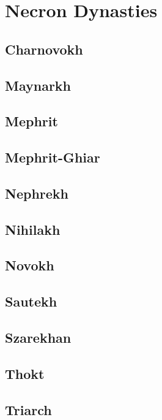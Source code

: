 \section{Necron Dynasties}

\subsection{Charnovokh}

\subsection{Maynarkh}

\subsection{Mephrit}

\subsection{Mephrit-Ghiar}

\subsection{Nephrekh}

\subsection{Nihilakh}

\subsection{Novokh}

\subsection{Sautekh}

\subsection{Szarekhan}

\subsection{Thokt}

\subsection{Triarch}

